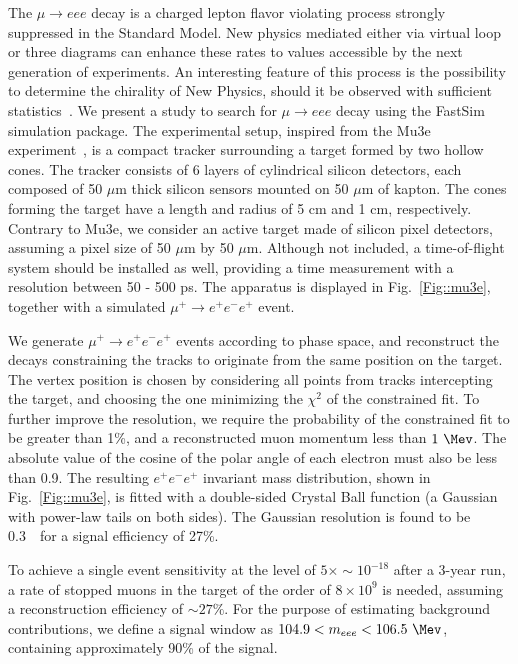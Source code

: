 


The $\mu \rightarrow eee$ decay is a charged lepton flavor violating process strongly suppressed in the Standard Model. New physics mediated either via virtual loop or three diagrams can enhance these rates to values accessible by the next generation of experiments. An interesting feature of this process is 
the possibility to determine the chirality of New Physics, should it be observed with sufficient statistics~\cite{Okada:1999zk}. We present a study to search for $\mu \rightarrow eee$ decay using the FastSim simulation package. The experimental setup, inspired from the Mu3e experiment~\cite{Blondel:2013ia}, is a compact tracker surrounding a target formed by two hollow cones. The tracker consists of 6 layers of cylindrical silicon detectors, each composed of 50 $\mu$m thick silicon sensors mounted on 
50 $\mu$m of kapton. The cones forming the target have a length and radius of 5 cm and 1 cm, respectively. Contrary to Mu3e, we consider an active target made of silicon pixel detectors, 
assuming a pixel size of 50 $\mu$m by 50 $\mu$m. Although not included, a time-of-flight system should be installed as well, providing a time measurement with a resolution between 50 - 500 ps. The apparatus is displayed in Fig.~\ref{Fig::mu3e}, together with a simulated $\mu^+ \rightarrow e^+e^-e^+$ event.

We generate $\mu^+ \rightarrow e^+e^-e^+$ events according to phase space, and reconstruct the decays constraining the tracks to originate from the same position on the target. The vertex 
position is chosen by considering all points from tracks intercepting the target, and choosing the one minimizing the $\chi^2$ of the constrained fit. To further improve the 
resolution, we require the probability of the constrained fit to be greater than 1\%, and a reconstructed muon momentum less than $1 ~\Mev$. The absolute value of the cosine of the polar angle of each electron must also be less than 0.9. The resulting $e^+e^-e^+$ invariant mass distribution, shown in Fig.~\ref{Fig::mu3e}, is fitted with a double-sided Crystal Ball function (a Gaussian with power-law tails on both sides). The Gaussian resolution is found to be 0.3~\Mev\ for a signal efficiency of 27\%. 

To achieve a single event sensitivity at the level of $5\times\sim 10^{-18}$ after a 3-year run, a rate of stopped muons in the target of the order of $8\times 10^{9}$ is needed, assuming 
a reconstruction efficiency of $\sim 27\%$. For the purpose of estimating background contributions, we define a signal window as $ 104.9 < m_{eee} < 106.5 ~\Mev$, containing approximately 90\% of the signal. 

